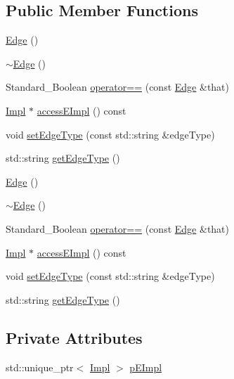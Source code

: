 \subsection*{Public Member Functions}
\begin{DoxyCompactItemize}
\item 
\hyperlink{classMcCAD_1_1Geometry_1_1Edge_ad957a8f3723cac10b2671c00f926afa7}{Edge} ()
\item 
\hyperlink{classMcCAD_1_1Geometry_1_1Edge_a9f51386d50723a6e1cc55c8620f28a45}{$\sim$\+Edge} ()
\item 
Standard\+\_\+\+Boolean \hyperlink{classMcCAD_1_1Geometry_1_1Edge_aa7e1e9e38c7e7aa6d09281c32fadbe1f}{operator==} (const \hyperlink{classMcCAD_1_1Geometry_1_1Edge}{Edge} \&that)
\item 
\hyperlink{classMcCAD_1_1Geometry_1_1Edge_1_1Impl}{Impl} $\ast$ \hyperlink{classMcCAD_1_1Geometry_1_1Edge_ac3223b5f5164833227e2c30d7d45271d}{access\+E\+Impl} () const
\item 
void \hyperlink{classMcCAD_1_1Geometry_1_1Edge_a3484c314c0b6f06116436923f16f99fe}{set\+Edge\+Type} (const std\+::string \&edge\+Type)
\item 
std\+::string \hyperlink{classMcCAD_1_1Geometry_1_1Edge_ac5181adb5c133b971a23a7a87d9c8d39}{get\+Edge\+Type} ()
\item 
\hyperlink{classMcCAD_1_1Geometry_1_1Edge_ad957a8f3723cac10b2671c00f926afa7}{Edge} ()
\item 
\hyperlink{classMcCAD_1_1Geometry_1_1Edge_a9f51386d50723a6e1cc55c8620f28a45}{$\sim$\+Edge} ()
\item 
Standard\+\_\+\+Boolean \hyperlink{classMcCAD_1_1Geometry_1_1Edge_aa7e1e9e38c7e7aa6d09281c32fadbe1f}{operator==} (const \hyperlink{classMcCAD_1_1Geometry_1_1Edge}{Edge} \&that)
\item 
\hyperlink{classMcCAD_1_1Geometry_1_1Edge_1_1Impl}{Impl} $\ast$ \hyperlink{classMcCAD_1_1Geometry_1_1Edge_a9e5a6133097a8cff17490aca6900514d}{access\+E\+Impl} () const
\item 
void \hyperlink{classMcCAD_1_1Geometry_1_1Edge_a3484c314c0b6f06116436923f16f99fe}{set\+Edge\+Type} (const std\+::string \&edge\+Type)
\item 
std\+::string \hyperlink{classMcCAD_1_1Geometry_1_1Edge_ac5181adb5c133b971a23a7a87d9c8d39}{get\+Edge\+Type} ()
\end{DoxyCompactItemize}
\subsection*{Private Attributes}
\begin{DoxyCompactItemize}
\item 
std\+::unique\+\_\+ptr$<$ \hyperlink{classMcCAD_1_1Geometry_1_1Edge_1_1Impl}{Impl} $>$ \hyperlink{classMcCAD_1_1Geometry_1_1Edge_aefb1a25627999c87d4984bb505550626}{p\+E\+Impl}
\end{DoxyCompactItemize}


